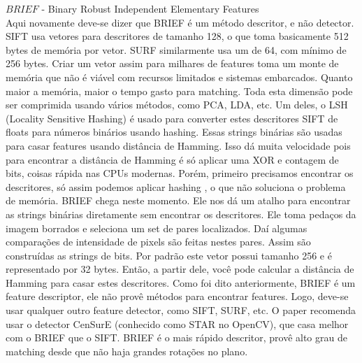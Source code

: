 \documentclass[conference]{IEEEtran}
\begin{document}
	  $BRIEF$ - Binary Robust Independent Elementary Features						\\
	  \nobreak\hspace{.16667em plus .08333em} 
	  Aqui novamente deve-se dizer que BRIEF \'e um m\'etodo descritor, e n\~ao detector.
	  SIFT usa vetores para descritores de tamanho 128, o que toma basicamente 512 bytes de mem\'oria por vetor. SURF similarmente 
	  usa um de 64, com m\'inimo de 256 bytes. Criar um vetor assim para milhares de features toma um monte de mem\'oria 
	  que n\~ao \'e vi\'avel com recursos limitados e sistemas embarcados. Quanto maior a mem\'oria, maior o tempo gasto 
	  para matching.
	  Toda esta dimens\~ao pode ser comprimida usando v\'arios m\'etodos, como PCA, LDA, etc. Um deles, o LSH (Locality 
	  Sensitive Hashing) \'e usado para converter estes descritores SIFT de floats para n\'umeros bin\'arios usando 
	  hashing. Essas strings bin\'arias s\~ao usadas para casar features usando dist\^ancia de Hamming. Isso d\'a muita 
	  velocidade pois para encontrar a dist\^ancia de Hamming \'e s\'o aplicar uma XOR e contagem de bits, coisas r\'apida nas 
	  CPUs modernas. 
	  Por\'em, primeiro precisamos encontrar os descritores, s\'o assim podemos aplicar hashing , o que n\~ao soluciona 
	  o problema de mem\'oria. BRIEF chega neste momento.
	  Ele nos d\'a um atalho para encontrar as strings bin\'arias diretamente sem encontrar os descritores.
	  Ele toma peda\c{c}os da imagem borrados e seleciona um set de pares localizados. Da\'i algumas compara\c{c}\~oes de 
	  intensidade de pixels s\~ao feitas nestes pares. Assim s\~ao constru\'idas as strings de bits. Por padr\~ao este 
	  vetor possui tamanho 256 e \'e representado por 32 bytes. Ent\~ao, a partir dele, voc\^e pode calcular a dist\^ancia 
	  de Hamming para casar estes descritores. 
	  Como foi dito anteriormente, BRIEF \'e um feature descriptor, ele n\~ao prov\^e m\'etodos para encontrar features.
	  Logo, deve-se usar qualquer outro feature detector, como SIFT, SURF, etc. O paper recomenda usar o detector CenSurE
	  (conhecido como STAR  no OpenCV), que casa melhor com o BRIEF que o SIFT.
	  BRIEF \'e o mais r\'apido descritor, prov\^e alto grau de matching desde que n\~ao haja grandes rota\c{c}\~oes no
	  plano.	\\
	  
\end{document}
